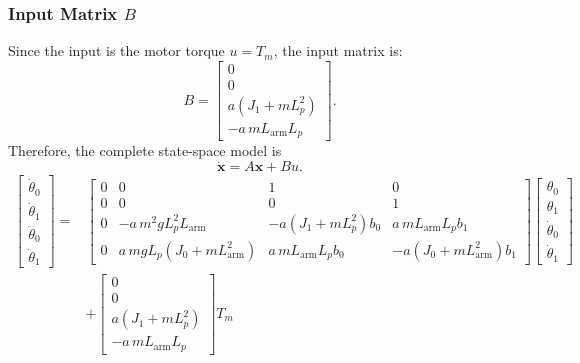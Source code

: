 \documentclass[a4paper,11pt]{article}
\newcommand{\La}{L_{\mathrm{arm}}}
\begin{document}
\subsubsection{Input Matrix \texorpdfstring{$B$}{B}}
Since the input is the motor torque $u = T_m$, the input matrix is:
\begin{equation}
\boxed{
B = \begin{bmatrix} 0 \\ 0 \\ a\left(J_1 + m L_p^2\right) \\ -a\, m \La L_p \end{bmatrix}.
}
\end{equation}
Therefore, the complete state-space model is
\begin{equation}
\boxed{\dot{\mathbf{x}} = A\mathbf{x} + Bu .}
\end{equation}
\begin{equation}
\begin{aligned}
\begin{bmatrix} \dot\theta_0 \\ \dot\theta_1 \\ \ddot\theta_0 \\ \ddot\theta_1 \end{bmatrix}
= {}&
\begin{bmatrix}
0 & 0 & 1 & 0\\
0 & 0 & 0 & 1\\
0 & -a\, m^2 g L_p^2 \La & -a\left(J_1 + m L_p^2\right) b_0 & a\, m \La L_p b_1\\
0 & a\, m g L_p \left(J_0 + m \La^2\right) & a\, m \La L_p b_0 & -a\left(J_0 + m \La^2\right) b_1
\end{bmatrix}
\begin{bmatrix} \theta_0 \\ \theta_1 \\ \dot\theta_0 \\ \dot\theta_1 \end{bmatrix}\\
& + \begin{bmatrix} 0 \\ 0 \\ a\left(J_1 + m L_p^2\right) \\ -a\, m \La L_p \end{bmatrix} T_m
\end{aligned}
\label{eq:ss4T}
\end{equation}
\end{document}
